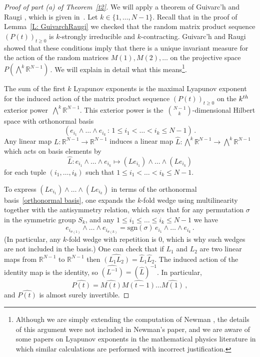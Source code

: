 \documentclass[12pt]{article}
\newcommand{\1}{\mathbf{1}}
\begin{document}
\begin{proof}[Proof of part (a) of Theorem~\ref{t2}]
We will apply a theorem of Guivarc'h and Raugi \cite{GR}, which is given in~\cite[Ch.~4, Thm.~1.2]{BougerolLacroix}. Let $k \in \{1, \dots, N-1\}$. Recall that in the proof of Lemma~\ref{L: GuivarchRaugi} we checked that the random matrix product sequence $\left(P(t)\right)_{t \ge 0}$ is $k$-strongly irreducible and $k$-contracting.  Guivarc'h and Raugi showed that these conditions imply that there is a unique invariant measure for the action of the random matrices $M(1), M(2), \dots$ on the projective space {$P\left(\bigwedge^k \mathbb{R}^{N-1}\right)$\,}. We will explain in detail what this means\footnote{Although we are simply extending the computation of Newman \cite{Newman}, the details of this argument were not included in Newman's paper, and we are aware of some papers on Lyapunov exponents in the mathematical physics literature in which similar calculations are performed with incorrect justification.}.

The sum of the first $k$ Lyapunov exponents is the maximal Lyapunov exponent for the induced action of the matrix product sequence $\left(P(t)\right)_{t \ge 0}$ on the $k^{\textup{th}}$ exterior power~$\bigwedge^k \mathbb{R}^{N-1}$. This exterior power is the~$\binom{N-1}{k}$-dimensional Hilbert space with orthonormal basis \begin{equation}\label{orthonormal basis} (e_{i_1} \wedge \dots \wedge e_{i_k}\,:\, 1 \le i_1 < \dots < i_k \le N-1)\,.\end{equation}  Any linear map $L: \mathbb{R}^{N-1} \to \mathbb{R}^{N-1}$ induces a linear map $\hat{L}:  \bigwedge^k \mathbb{R}^{N-1} \to \bigwedge^k \mathbb{R}^{N-1}$ which acts on basis elements by $$\hat{L}: e_{i_1} \wedge \dots \wedge e_{i_k} \mapsto \left(Le_{i_1}\right) \wedge \dots \wedge \left(Le_{i_k}\right)$$ for each tuple $(i_1, \dots, i_k)$ such that $1 \le i_1 < \dots < i_k \le N-1$. 

To express $\left(Le_{i_1}\right) \wedge \dots \wedge \left(Le_{i_k}\right)$ in terms of the orthonormal basis~\eqref{orthonormal basis}, one expands the $k$-fold wedge using multilinearity together with the antisymmetry relation, which says that for any permutation $\sigma$ in the symmetric group $S_k$, and any $1 \le i_1 \le \dots\le i_k \le N-1$ we have {
 $$
 e_{i_{\sigma(1)}} \wedge \dots \wedge e_{i_{\sigma(k)}} = \mathrm{sgn}(\sigma) \,e_{i_1} \wedge \dots \wedge e_{i_k}\,.
 $$ }
(In particular, any $k$-fold wedge with repetition is $0$, which is why such wedges are not included in the basis.)  One can check that if $L_1$ and $L_2$ are two linear maps from $\mathbb{R}^{N-1}$ to $\mathbb{R}^{N-1}$ then $\widehat{(L_1 L_2)} = \hat{L}_1 \hat{L}_2$. The induced action of the identity map is the identity, so $\widehat{(L^{-1})} = (\hat{L})^{-1}$. In particular, 
 $$ \widehat{P(t)} = \widehat{M(t)}\widehat{M(t-1)} \dots \widehat{M(1)}\,,$$ and $\widehat{P(t)}$ is almost surely invertible.
 

\end{proof}
\end{document}
